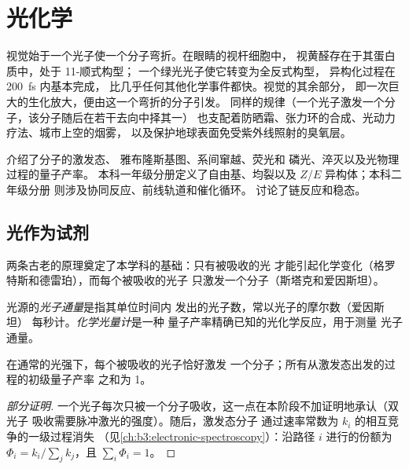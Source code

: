 \chapter{光化学}\label{ch:b3:photochemistry}

视觉始于一个光子使一个分子弯折。在眼睛的视杆细胞中，
视黄醛存在于其蛋白质中，处于 11-顺式构型；
一个绿光光子使它转变为全反式构型，
异构化过程在 \qty{200}{fs} 内基本完成，
比几乎任何其他化学事件都快。视觉的其余部分，
即一次巨大的生化放大，便由这一个弯折的分子引发。
同样的规律（一个光子激发一个分子，该分子随后在若干去向中择其一）
也支配着防晒霜、张力环的合成、光动力疗法、城市上空的烟雾，
以及保护地球表面免受紫外线照射的臭氧层。

\begin{recall}
介绍了分子的激发态、
雅布隆斯基图、系间窜越、荧光和
磷光、淬灭以及光物理过程的量子产率。
本科一年级分册定义了自由基、均裂以及 $Z$/$E$ 异构体；本科二年级分册
则涉及协同反应、前线轨道和催化循环。
讨论了链反应和稳态。
\end{recall}

\section{光作为试剂}

两条古老的原理奠定了本学科的基础：只有被吸收的光
才能引起化学变化（格罗特斯和德雷珀），而每个被吸收的光子
只激发一个分子（斯塔克和爱因斯坦）。

\begin{definition}\label{def:b3:photochemistry:photon-flux}
光源的\emph{光子通量}是指其单位时间内
发出的光子数，常以光子的摩尔数（爱因斯坦）
每秒计。\emph{化学光量计}是一种
量子产率精确已知的光化学反应，用于测量
光子通量。
\end{definition}

\begin{proposition}\label{prop:b3:photochemistry:stark-einstein}
在通常的光强下，每个被吸收的光子恰好激发
一个分子；所有从激发态出发的过程的初级量子产率
之和为 1。
\end{proposition}

\begin{proof}[部分证明]
一个光子每次只被一个分子吸收，这一点在本阶段不加证明地承认（双光子
吸收需要脉冲激光的强度）。随后，激发态分子
通过速率常数为 $k_i$ 的相互竞争的一级过程消失
（见\cref{ch:b3:electronic-spectroscopy}）：沿路径 $i$ 进行的份额为 $\Phi_i =
k_i/\sum_jk_j$，且 $\sum_i\Phi_i = 1$。
\end{proof}

